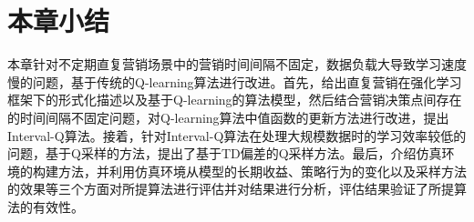 \section{本章小结}
本章针对不定期直复营销场景中的营销时间间隔不固定，数据负载大导致学习速度慢的问题，基于传统的Q-learning算法进行改进。首先，给出直复营销在强化学习框架下的形式化描述以及基于Q-learning的算法模型，然后结合营销决策点间存在的时间间隔不固定问题，对Q-learning算法中值函数的更新方法进行改进，提出Interval-Q算法。接着，针对Interval-Q算法在处理大规模数据时的学习效率较低的问题，基于Q采样的方法，提出了基于TD偏差的Q采样方法。最后，介绍仿真环境的构建方法，并利用仿真环境从模型的长期收益、策略行为的变化以及采样方法的效果等三个方面对所提算法进行评估并对结果进行分析，评估结果验证了所提算法的有效性。

\cleardoublepage
